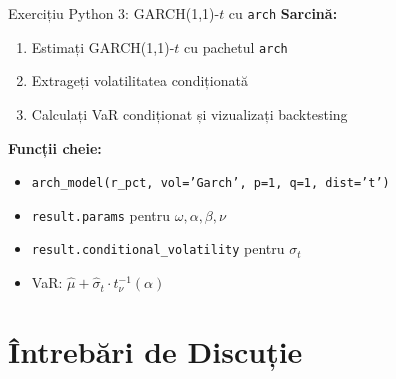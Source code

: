\documentclass[9pt, aspectratio=169, t]{beamer}
\begin{document}
\begin{frame}[fragile]{Exercițiu Python 3: GARCH(1,1)-$t$ cu \texttt{arch}}
    \textbf{Sarcină:}
    \begin{enumerate}\setlength{\itemsep}{0pt}
        \item Estimați GARCH(1,1)-$t$ cu pachetul \texttt{arch}
        \item Extrageți volatilitatea condiționată
        \item Calculați VaR condiționat și vizualizați backtesting
    \end{enumerate}

    \vspace{0.3cm}
    \textbf{Funcții cheie:}
    \begin{itemize}\setlength{\itemsep}{0pt}
        \item \texttt{arch\_model(r\_pct, vol='Garch', p=1, q=1, dist='t')}
        \item \texttt{result.params} pentru $\omega, \alpha, \beta, \nu$
        \item \texttt{result.conditional\_volatility} pentru $\sigma_t$
        \item VaR: $\hat{\mu} + \hat{\sigma}_t \cdot t_\nu^{-1}(\alpha)$
    \end{itemize}

\end{frame}

\section{Întrebări de Discuție}
\end{document}
